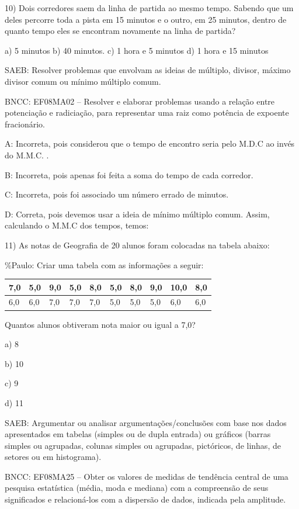 10) Dois corredores saem da linha de partida ao mesmo tempo. Sabendo que
um deles percorre toda a pista em 15 minutos e o outro, em 25 minutos,
dentro de quanto tempo eles se encontram novamente na linha de partida?

a) 5 minutos b) 40 minutos. c) 1 hora e 5 minutos d) 1 hora e 15 minutos

SAEB: Resolver problemas que envolvam as ideias de múltiplo, divisor,
máximo divisor comum ou mínimo múltiplo comum.

BNCC: EF08MA02 -- Resolver e elaborar problemas usando a relação entre
potenciação e radiciação, para representar uma raiz como potência de
expoente fracionário.

A: Incorreta, pois considerou que o tempo de encontro seria pelo M.D.C
ao invés do M.M.C. .

B: Incorreta, pois apenas foi feita a soma do tempo de cada corredor.

C: Incorreta, pois foi associado um número errado de minutos.

D: Correta, pois devemos usar a ideia de mínimo múltiplo comum. Assim,
calculando o M.M.C dos tempos, temos:

11) As notas de Geografia de 20 alunos foram colocadas na tabela abaixo:

\%Paulo: Criar uma tabela com as informações a seguir:

\begin{longtable}[]{@{}llllllllll@{}}
\toprule
7,0 & 5,0 & 9,0 & 5,0 & 8,0 & 5,0 & 8,0 & 9,0 & 10,0 &
8,0\tabularnewline
\midrule
\endhead
6,0 & 6,0 & 7,0 & 7,0 & 7,0 & 5,0 & 5,0 & 5,0 & 6,0 & 6,0\tabularnewline
\bottomrule
\end{longtable}

Quantos alunos obtiveram nota maior ou igual a 7,0?

a) 8

b) 10

c) 9

d) 11

SAEB: Argumentar ou analisar argumentações/conclusões com base nos dados
apresentados em tabelas (simples ou de dupla entrada) ou gráficos
(barras simples ou agrupadas, colunas simples ou agrupadas, pictóricos,
de linhas, de setores ou em histograma).

BNCC: EF08MA25 -- Obter os valores de medidas de tendência central de
uma pesquisa estatística (média, moda e mediana) com a compreensão de
seus significados e relacioná-los com a dispersão de dados, indicada
pela amplitude.

